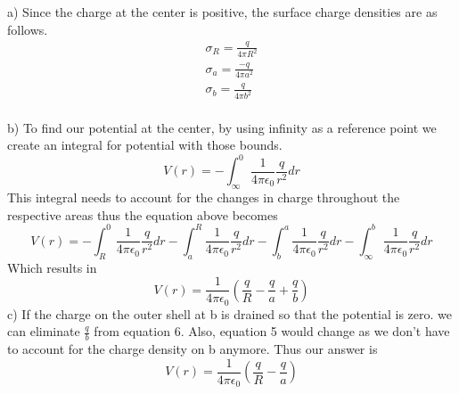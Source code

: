 \documentclass{article}
\begin{document}
a) Since the charge at the center is positive, the surface charge densities are as follows.
\begin{align}
\sigma_R=\frac{q}{4{\pi}R^2}\\
\sigma_a=\frac{-q}{4{\pi}a^2}\\
\sigma_b=\frac{q}{4{\pi}b^2}
\end{align}
\\
b) To find our potential at the center, by using infinity as a reference point we create an integral for potential with those bounds.
\begin{equation}
V(r)
=
-\int_{\infty}^{0}\frac{1}{4{\pi}{\epsilon_0}}\frac{q}{r^2} dr
\end{equation}
This integral needs to account for the changes in charge throughout the respective areas thus the equation above becomes
\begin{equation}
V(r)
=
-\int_{R}^{0}\frac{1}{4{\pi}{\epsilon_0}}\frac{q}{r^2} dr-\int_{a}^{R}\frac{1}{4{\pi}{\epsilon_0}}\frac{q}{r^2} dr
-\int_{b}^{a}\frac{1}{4{\pi}{\epsilon_0}}\frac{q}{r^2} dr -\int_{\infty}^{b}\frac{1}{4{\pi}{\epsilon_0}}\frac{q}{r^2} dr
\end{equation}
Which results in
\begin{equation}
V(r)
=
\frac{1}{4{\pi}{\epsilon_0}}(\frac{q}{R}-\frac{q}{a}+\frac{q}{b})
\end{equation}
c) If the charge on the outer shell at b is drained so that the potential is zero. we can eliminate $\frac{q}{b}$ from equation 6. Also, equation 5 would change as we don't have to account for the charge density on b anymore. Thus our answer is 
\begin{equation}
V(r)
=
\frac{1}{4{\pi}{\epsilon_0}}(\frac{q}{R}-\frac{q}{a})
\end{equation}
\end{document}
